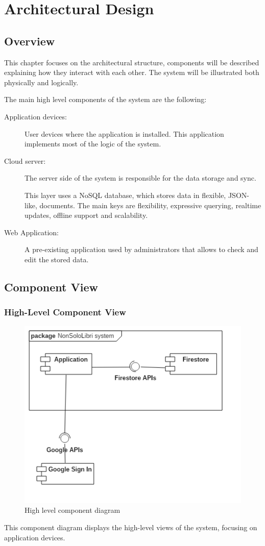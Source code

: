\chapter{Architectural Design}
\section{Overview}
This chapter focuses on the architectural structure, components will be described explaining how they interact with each other.
The system will be illustrated both physically and logically.

The main high level components of the system are the following:
\begin{description}
    \item[Application devices:] User devices where the application is installed. This application implements most of the logic of the system.
    \item[Cloud server:]  The server side of the system is responsible for the data storage and sync.
    
    This layer uses a NoSQL database, 
    which stores data in flexible, JSON-like, documents. The main keys are flexibility, expressive querying, realtime updates, offline support and scalability.
    \item[Web Application:] A pre-existing application used by administrators that allows to check and edit the stored data.
\end{description}

\newpage

\section{Component View}
\subsection{High-Level Component View}
\begin{figure}[!h]
    \centering
    \includegraphics[scale=0.5]{images/high-level-component-view.png}
    \caption{High level component diagram}
    \label{ref:highlevelcomponentdiagram}
\end{figure}
This component diagram displays the high-level views of the system, focusing on application devices.

